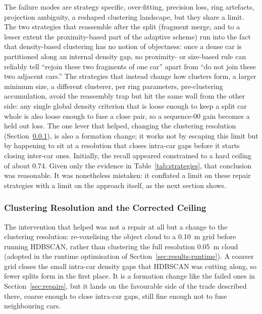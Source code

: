 \documentclass[a4paper,12pt]{report}
\begin{document}
The failure modes are strategy specific, over-fitting, precision loss, ring
artefacts, projection ambiguity, a reshaped clustering landscape, but they share
a limit. The two strategies that reassemble after the split (fragment merge, and to
a lesser extent the proximity-based part of the adaptive scheme) run into the fact
that density-based clustering has no notion of objectness: once a dense car is
partitioned along an internal density gap, no proximity- or size-based rule can
reliably tell ``rejoin these two fragments of one car'' apart from ``do not join
these two adjacent cars.'' The strategies that instead change how clusters
form, a larger minimum size, a different clusterer, per ring parameters,
pre-clustering accumulation, avoid the reassembly trap but hit the same wall from
the other side: any single global density criterion that is loose enough to keep a
split car whole is also loose enough to fuse a close pair, so a sequence-00 gain
becomes a held out loss. The one lever that helped, changing the clustering
resolution (Section~\ref{sec:resolution-fix}), is also a formation change; it
works not by escaping this limit but by happening to sit at a resolution that closes
intra-car gaps before it starts closing inter-car ones. Initially, the recall appeared
constrained to a hard ceiling of about \num{0.74}. Given only the evidence in
Table~\ref{tab:strategies}, that conclusion was reasonable. It was nonetheless mistaken:
it conflated a limit on these repair strategies with a limit on the approach itself, as
the next section shows.

\subsubsection{Clustering Resolution and the Corrected Ceiling}
\label{sec:resolution-fix}

The intervention that helped was not a repair at all but a change to the clustering
resolution: re-voxelising the object cloud to a \SI{0.10}{\metre} grid
before running HDBSCAN, rather than clustering the full resolution
\SI{0.05}{\metre} cloud (adopted in the runtime optimisation of
Section~\ref{sec:results-runtime}). A coarser grid closes the small intra-car density gaps that HDBSCAN was
cutting along, so fewer splits form in the first place. It is a formation change like
the failed ones in Section~\ref{sec:repairs}, but it lands on the favourable side of
the trade described there, coarse enough to close intra-car gaps, still fine
enough not to fuse neighbouring cars.
\end{document}

